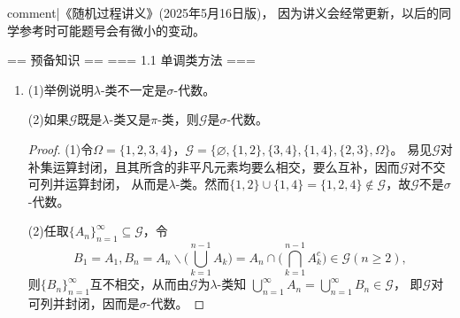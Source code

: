 \newcommand{\E}{\mathbb{E}}
\newcommand{\F}{\mathcal{F}}
\newcommand{\G}{\mathcal{G}}
\renewcommand{\P}{\mathbb{P}}
\newcommand{\W}{\mathcal{W}}
\newcommand{\eps}{\varepsilon}
\newcommand{\bE}{\overline{\E}}
\newcommand{\bp}{\bar{p}}
\newcommand{\bP}{\overline{\P}}
\def\as{\text{ a.s. }}
\def\st{\text{ s.t. }}

{{comment|《随机过程讲义》(2025年5月16日版)，
因为讲义会经常更新，以后的同学参考时可能题号会有微小的变动。}}

== 预备知识 ==
=== 1.1 单调类方法 ===
\begin{enumerate}
    \item[1.1.1] (1)举例说明$\lambda$-类不一定是$\sigma$-代数。

    (2)如果$\G$既是$\lambda$-类又是$\pi$-类，则$\G$是$\sigma$-代数。
    \begin{proof}
        (1)令$\Omega=\{1,2,3,4\}$，$\G=\{\varnothing,\{1,2\},\{3,4\},\{1,4\},\{2,3\},\Omega\}$。
        易见$\G$对补集运算封闭，且其所含的非平凡元素均要么相交，要么互补，因而$\G$对不交可列并运算封闭，
        从而是$\lambda$-类。然而$\{1,2\}\cup\{1,4\}=\{1,2,4\}\notin\G$，故$\G$不是$\sigma$-代数。

        (2)任取$\{A_n\}_{n=1}^\infty\subseteq\G$，令
        \[B_1=A_1,B_n=A_n\backslash\bigg(\bigcup_{k=1}^{n-1}A_k\bigg)=A_n\cap\bigg(\bigcap_{k=1}^{n-1}A_k^c\bigg)\in\G(n\geqslant2),\]
        则$\{B_n\}_{n=1}^\infty$互不相交，从而由$\G$为$\lambda$-类知
        $\bigcup\limits_{n=1}^\infty A_n=\bigcup\limits_{n=1}^\infty B_n\in\G$，
        即$\G$对可列并封闭，因而是$\sigma$-代数。
    \end{proof}
\end{enumerate}

